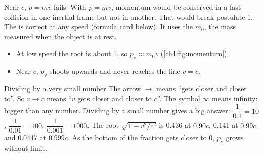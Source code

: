 \begin{sidebyside}[0.47]
  \centering
  \label{ch4:fig:momentum}
\nextside
  Near $c$, $p = mv$ fails. With $p = mv$, momentum would be conserved in a fast collision in
  one inertial frame but not in another. That would break postulate 1. The  is correct at
  any speed (formula card below). It uses the  $m_0$, the mass measured when
  the object is at rest.
  \begin{itemize}
    \item At low speed the root is about 1, so $p_\mathrm{v} \approx m_0v$
          (\cref{ch4:fig:momentum}).
    \item Near $c$, $p_\mathrm{v}$ shoots upwards and never reaches the line $v = c$.
  \end{itemize}
\end{sidebyside}

\begin{toolkit}{Dividing by a very small number}
The arrow $\to$ means ``gets closer and closer to''. So $v \to c$ means ``$v$ gets closer and
closer to $c$''. The symbol $\infty$ means infinity: bigger than any number. Dividing by a small
number gives a big answer: $\dfrac{1}{0.1} = 10$, $\dfrac{1}{0.01} = 100$,
$\dfrac{1}{0.001} = 1000$. The root $\sqrt{1 - v^2/c^2}$ is 0.436 at $0.90c$, 0.141 at $0.99c$
and 0.0447 at $0.999c$. As the bottom of the fraction gets closer to 0, $p_\mathrm{v}$ grows
without limit.
\end{toolkit}

